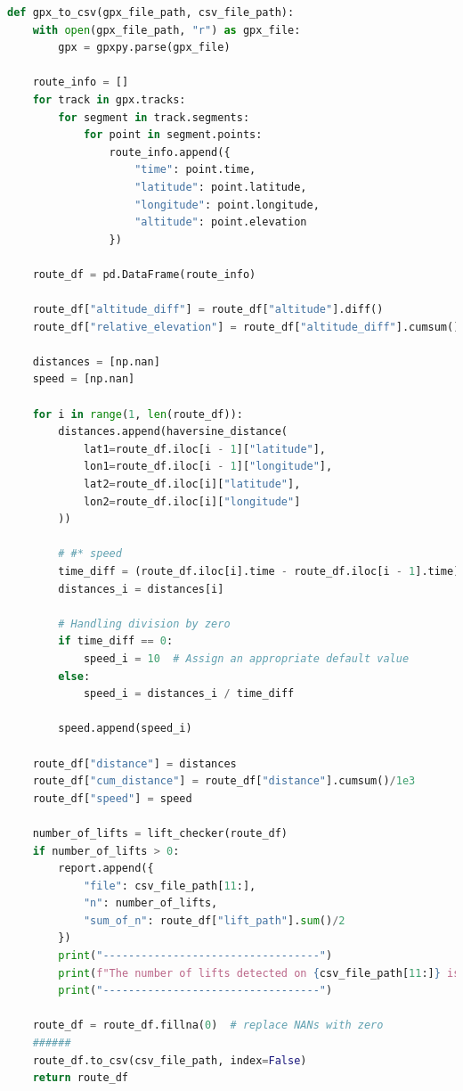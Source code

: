 \begin{lstlisting}[language=Python]
def gpx_to_csv(gpx_file_path, csv_file_path):
    with open(gpx_file_path, "r") as gpx_file:
        gpx = gpxpy.parse(gpx_file)

    route_info = []
    for track in gpx.tracks:
        for segment in track.segments:
            for point in segment.points:
                route_info.append({
                    "time": point.time,
                    "latitude": point.latitude,
                    "longitude": point.longitude,
                    "altitude": point.elevation
                })

    route_df = pd.DataFrame(route_info)

    route_df["altitude_diff"] = route_df["altitude"].diff()
    route_df["relative_elevation"] = route_df["altitude_diff"].cumsum()

    distances = [np.nan]
    speed = [np.nan]

    for i in range(1, len(route_df)):
        distances.append(haversine_distance(
            lat1=route_df.iloc[i - 1]["latitude"],
            lon1=route_df.iloc[i - 1]["longitude"],
            lat2=route_df.iloc[i]["latitude"],
            lon2=route_df.iloc[i]["longitude"]
        ))

        # #* speed
        time_diff = (route_df.iloc[i].time - route_df.iloc[i - 1].time).seconds
        distances_i = distances[i]

        # Handling division by zero
        if time_diff == 0:
            speed_i = 10  # Assign an appropriate default value
        else:
            speed_i = distances_i / time_diff

        speed.append(speed_i)

    route_df["distance"] = distances
    route_df["cum_distance"] = route_df["distance"].cumsum()/1e3
    route_df["speed"] = speed

    number_of_lifts = lift_checker(route_df)
    if number_of_lifts > 0:
        report.append({
            "file": csv_file_path[11:],
            "n": number_of_lifts,
            "sum_of_n": route_df["lift_path"].sum()/2
        })
        print("----------------------------------")
        print(f"The number of lifts detected on {csv_file_path[11:]} is {number_of_lifts}")
        print("----------------------------------")

    route_df = route_df.fillna(0)  # replace NANs with zero
    ######
    route_df.to_csv(csv_file_path, index=False)
    return route_df
\end{lstlisting}

